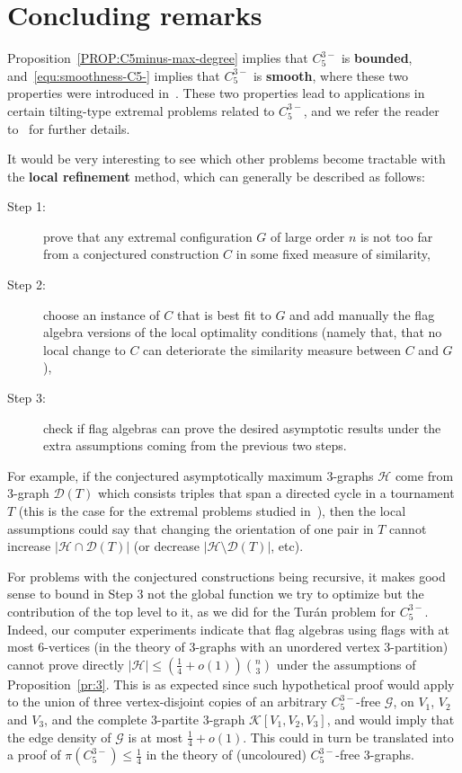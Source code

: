 \documentclass[11pt,a4paper]{article}
\theoremstyle{remark}
\newcommand{\C}[1]{\mathcal{#1}}
\begin{document}
\section{Concluding remarks}\label{SEC:remark}
%
Proposition~\ref{PROP:C5minus-max-degree} implies that $C_{5}^{3-}$ is \textbf{bounded}, and~\eqref{equ:smoothness-C5-} implies that $C_{5}^{3-}$ is \textbf{smooth}, where these two properties were introduced in~\cite{HLLYZ23}. These two properties lead to applications in certain tilting-type extremal problems related to $C_{5}^{3-}$, and we refer the reader to~\cite{HLLYZ23,DHLY24} for further details. 



It would be very interesting to see which other problems become tractable with the \textbf{local refinement} method, which can generally be described as follows: 
\begin{description}
    \item[Step 1:] \label{it:LR1}
prove that any extremal configuration $G$ of large order $n$ is not too far from a conjectured construction $C$ in some fixed measure of similarity,
\item[Step 2:]\label{it:LR2} choose an instance of $C$ that is best fit to $G$ and add manually the flag algebra versions of the local optimality conditions (namely that, that no local change to $C$ can deteriorate the similarity measure between $C$ and $G$), 
\item[Step 3:]\label{it:RL3} check if flag algebras can prove the desired asymptotic results under the extra assumptions coming from the previous two steps.
\end{description}

For example, if the conjectured asymptotically
maximum 3-graphs $\C H$ come from 3-graph $\C D(T)$ which consists triples that span a directed cycle in a tournament  $T$ (this is the case for the extremal problems studied in~\cite{GlebovKralVolec16,ReiherRodlSchacht16jctb,FalgasPikhurkoVaughanVolec23}), then the local assumptions could say that changing the orientation of one pair in $T$ cannot increase $|\C H\cap \C D(T)|$ (or decrease $|\C H\setminus \C D(T)|$, etc).

For problems with the conjectured  constructions being recursive, it makes good sense to bound in Step 3 not the global function we try to optimize but the contribution of the top level to it, as we did for the Tur\'an problem for $C_{5}^{3-}$. Indeed, our computer experiments indicate that flag algebras using flags with at most 6-vertices (in the theory of 3-graphs with an unordered vertex 3-partition) cannot prove directly $|\C H|\le (\frac14+o(1)){n\choose 3}$ under the assumptions of Proposition~\ref{pr:3}. This is as expected since such hypothetical proof would apply to the union of three vertex-disjoint copies of an arbitrary $C_{5}^{3-}$-free $\C G$, on $V_1$, $V_2$ and $V_3$, and the complete $3$-partite $3$-graph $\mathcal{K}[V_1,V_2,V_3]$, and would imply that the edge density of $\C G$ is at most $\frac14+o(1)$. This could in turn be translated into a proof of $\pi(C_{5}^{3-})\le \frac 14$ in the theory of (uncoloured) $C_{5}^{3-}$-free $3$-graphs.
\end{document}
